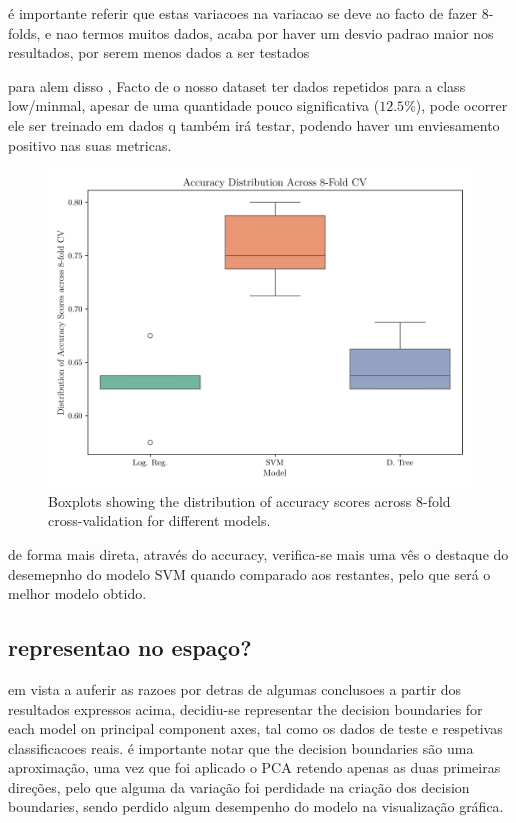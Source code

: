 \documentclass[conference]{IEEEtran}
\begin{document}
é importante referir que estas variacoes na variacao se deve ao facto de fazer 8-folds, e nao termos muitos dados, acaba por haver um desvio padrao maior nos resultados, por serem menos dados a ser testados

para alem disso , Facto de o nosso dataset ter dados repetidos para a class low/minmal, apesar de uma quantidade pouco significativa ($12.5\%$), pode ocorrer ele ser treinado em dados q também irá testar, podendo haver um enviesamento positivo nas suas metricas.

\begin{figure}[H]
    \centering
    \includegraphics[width=1\linewidth]{assets/box_accuracy.png}
    \caption{Boxplots showing the distribution of accuracy scores across 8-fold cross-validation for different models.}
    \label{box_accuracy}
\end{figure}

de forma mais direta, através do accuracy, verifica-se mais uma vês o destaque do desemepnho do modelo SVM quando comparado aos restantes, pelo que será o melhor modelo obtido.

\subsection{representao no espaço?}

em vista a auferir as razoes por detras de algumas conclusoes a partir dos resultados expressos acima, decidiu-se representar the decision boundaries for each model on principal component axes, tal como os dados de teste e respetivas classificacoes reais. é importante notar que the decision boundaries são uma aproximação, uma vez que foi aplicado o PCA retendo apenas as duas primeiras direções, pelo que alguma da variação foi perdidade na criação dos decision boundaries, sendo perdido algum desempenho do modelo na visualização gráfica.
\end{document}

